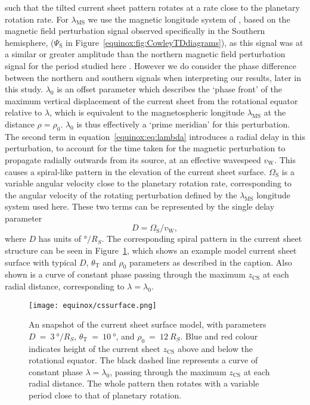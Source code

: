 such that the tilted current sheet pattern rotates at a rate close to the planetary rotation rate. For $\lambda_\mathrm{MS}$ we use the magnetic longitude system of \citet{andrews2012}, based on the magnetic field perturbation signal observed specifically in the Southern hemisphere, ($\Psi_\mathrm{S}$ in Figure~\ref{equinox:fig:CowleyTDdiagrams}), as this signal was at a similar or greater amplitude than the northern magnetic field perturbation signal for the period studied here \citep{andrews2012}. However we do consider the phase difference between the northern and southern signals when interpreting our results, later in this study. $\lambda_0$ is an offset parameter which describes the `phase front' of the maximum vertical displacement of the current sheet from the rotational equator relative to $\lambda$, which is equivalent to the magnetospheric longitude $\lambda_\mathrm{MS}$ at the distance $\rho = \rho_0$. $\lambda_0$ is thus effectively a `prime meridian' for this perturbation. The second term in equation~\ref{equinox:eq:lambda} introduces a radial delay in this perturbation, to account for the time taken for the magnetic perturbation to propagate radially outwards from its source, at an effective wavespeed $v_\mathrm{W}$. This causes a spiral-like pattern in the elevation of the current sheet surface. $\Omega_\mathrm{S}$ is a variable angular velocity close to the planetary rotation rate, corresponding to the angular velocity of the rotating perturbation defined by the $\lambda_\mathrm{MS}$ longitude system used here. These two terms can be represented by the single delay parameter
\begin{equation}\label{equinox:eq:D}
D = \Omega_\mathrm{S}/v_\mathrm{W},
\end{equation}
where $D$ has units of $\si{\degree/R_S}$. The corresponding spiral pattern in the current sheet structure can be seen in Figure~\ref{equinox:fig:cssurfacemodel}, which shows an example model current sheet surface with typical $D$, $\theta_\mathrm{T}$ and $\rho_0$ parameters as described in the caption. Also shown is a curve of constant phase passing through the maximum $z_\mathrm{CS}$ at each radial distance, corresponding to $\lambda=\lambda_0$.
\begin{figure}
\centering
\texttt{[image: equinox/cssurface.png]}
\caption[Snapshot of tilted, rippled current sheet surface model.]{An snapshot of the current sheet surface model, with parameters $D~{=}~\SI{3}{\degree/R_S}$, $\theta_\mathrm{T}~{=}~\SI{10}{\degree}$, and $\rho_0~{=}~\SI{12}{R_S}$. Blue and red colour indicates height of the current sheet $z_\mathrm{CS}$ above and below the rotational equator. The black dashed line represents a curve of constant phase $\lambda = \lambda_0$, passing through the maximum $z_\mathrm{CS}$ at each radial distance. The whole pattern then rotates with a variable period close to that of planetary rotation.}
\label{equinox:fig:cssurfacemodel}
\end{figure}

